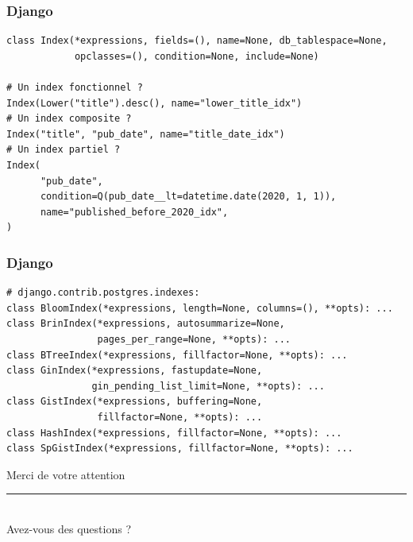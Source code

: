 \documentclass{beamer}
\begin{document}
\begin{frame}[fragile]
    \frametitle{Django}

    \begin{verbatim}
class Index(*expressions, fields=(), name=None, db_tablespace=None,
            opclasses=(), condition=None, include=None)

# Un index fonctionnel ?
Index(Lower("title").desc(), name="lower_title_idx")
# Un index composite ?
Index("title", "pub_date", name="title_date_idx")
# Un index partiel ?
Index(
      "pub_date",
      condition=Q(pub_date__lt=datetime.date(2020, 1, 1)),
      name="published_before_2020_idx",
)
    \end{verbatim}
\end{frame}

\begin{frame}[fragile]
    \frametitle{Django}

    \begin{verbatim}
# django.contrib.postgres.indexes:
class BloomIndex(*expressions, length=None, columns=(), **opts): ...
class BrinIndex(*expressions, autosummarize=None,
                pages_per_range=None, **opts): ...
class BTreeIndex(*expressions, fillfactor=None, **opts): ...
class GinIndex(*expressions, fastupdate=None,
               gin_pending_list_limit=None, **opts): ...
class GistIndex(*expressions, buffering=None,
                fillfactor=None, **opts): ...
class HashIndex(*expressions, fillfactor=None, **opts): ...
class SpGistIndex(*expressions, fillfactor=None, **opts): ...
    \end{verbatim}
\end{frame}

\begin{frame}[focus]
    Merci de votre attention
    \\
    \vspace{20pt}
    \rule{\textwidth}{1pt}
    \\
    \vspace{30pt}
    Avez-vous des questions ?
\end{frame}
\end{document}
